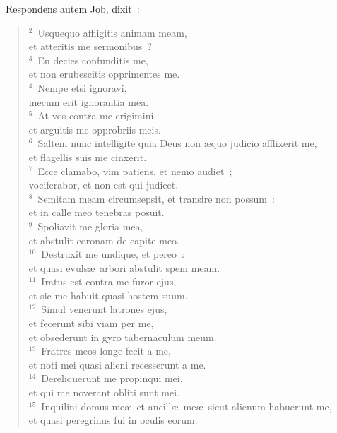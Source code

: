 ~\lettrine[lines=10,image=true,loversize=0.05,lraise=-0.03]{R}{}espondens autem Job, dixit~:
\begin{flushleft}\begin{verse}\vspace{6pt}${}^{2}$~Usquequo affligitis animam meam,\\ et atteritis me sermonibus~?\\
${}^{3}$~En decies confunditis me,\\ et non erubescitis opprimentes me.\\
${}^{4}$~Nempe etsi ignoravi,\\ mecum erit ignorantia mea.\\
${}^{5}$~At vos contra me erigimini,\\ et arguitis me opprobriis meis.\\
${}^{6}$~Saltem nunc intelligite quia Deus non \ae quo judicio afflixerit me,\\ et flagellis suis me cinxerit.\\
${}^{7}$~Ecce clamabo, vim patiens, et nemo audiet~;\\ vociferabor, et non est qui judicet.\\
${}^{8}$~Semitam meam circumsepsit, et transire non possum~:\\ et in calle meo tenebras posuit.\\
${}^{9}$~Spoliavit me gloria mea,\\ et abstulit coronam de capite meo.\\
${}^{10}$~Destruxit me undique, et pereo~:\\ et quasi evuls\ae\ arbori abstulit spem meam.\\
${}^{11}$~Iratus est contra me furor ejus,\\ et sic me habuit quasi hostem suum.\\
${}^{12}$~Simul venerunt latrones ejus,\\ et fecerunt sibi viam per me,\\ et obsederunt in gyro tabernaculum meum.\\
${}^{13}$~Fratres meos longe fecit a me,\\ et noti mei quasi alieni recesserunt a me.\\
${}^{14}$~Dereliquerunt me propinqui mei,\\ et qui me noverant obliti sunt mei.\\
${}^{15}$~Inquilini domus me\ae\ et ancill\ae\ me\ae\ sicut alienum habuerunt me,\\ et quasi peregrinus fui in oculis eorum.\\

\end{verse}
\end{flushleft}
